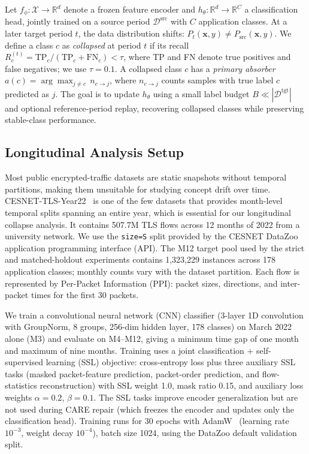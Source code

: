\documentclass[preprint,12pt,authoryear]{elsarticle}
\let\cite\citep
\newcommand{\ours}{CARE}  %
\begin{document}
Let $f_\phi: \mathcal{X} \to \mathbb{R}^d$ denote a frozen feature encoder and $h_\theta: \mathbb{R}^d \to \mathbb{R}^C$ a classification head, jointly trained on a source period $\mathcal{D}^{\text{src}}$ with $C$ application classes.
At a later target period $t$, the data distribution shifts: $P_t(\mathbf{x}, y) \neq P_{\text{src}}(\mathbf{x}, y)$.
We define a class $c$ as \textit{collapsed} at period $t$ if its recall $R_c^{(t)} = \text{TP}_c / ({\text{TP}_c + \text{FN}_c}) < \tau$, where TP and FN denote true positives and false negatives; we use $\tau{=}0.1$.
A collapsed class $c$ has a \textit{primary absorber} $a(c) = \arg\max_{j \neq c}\, n_{c \to j}$, where $n_{c \to j}$ counts samples with true label $c$ predicted as $j$.
The goal is to update $h_\theta$ using a small label budget $B \ll |\mathcal{D}^{\text{tgt}}|$ and optional reference-period replay, recovering collapsed classes while preserving stable-class performance.

\subsection{Longitudinal Analysis Setup}
\label{sec:setup_analysis}

Most public encrypted-traffic datasets are static snapshots without temporal partitions, making them unsuitable for studying concept drift over time.
CESNET-TLS-Year22~\cite{hynek2024cesnet} is one of the few datasets that provides month-level temporal splits spanning an entire year, which is essential for our longitudinal collapse analysis.
It contains 507.7M TLS flows across 12 months of 2022 from a university network.
We use the \texttt{size=S} split provided by the CESNET DataZoo application programming interface (API). The M12 target pool used by the strict and matched-holdout experiments contains 1{,}323{,}229 instances across 178 application classes; monthly counts vary with the dataset partition.
Each flow is represented by Per-Packet Information (PPI): packet sizes, directions, and inter-packet times for the first 30 packets.

We train a convolutional neural network (CNN) classifier (3-layer 1D convolution with GroupNorm, 8 groups, 256-dim hidden layer, 178 classes) on March 2022 alone (M3) and evaluate on M4--M12, giving a minimum time gap of one month and maximum of nine months.
Training uses a joint classification + self-supervised learning (SSL) objective: cross-entropy loss plus three auxiliary SSL tasks (masked packet-feature prediction, packet-order prediction, and flow-statistics reconstruction) with SSL weight 1.0, mask ratio 0.15, and auxiliary loss weights $\alpha{=}0.2$, $\beta{=}0.1$.
The SSL tasks improve encoder generalization but are not used during \ours{} repair (which freezes the encoder and updates only the classification head).
Training runs for 30 epochs with AdamW~\cite{loshchilov2019adamw} (learning rate $10^{-3}$, weight decay $10^{-4}$), batch size 1024, using the DataZoo default validation split.
\end{document}
